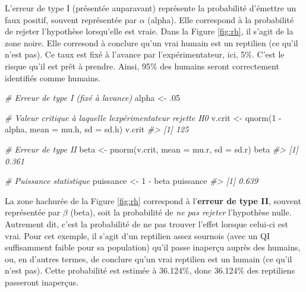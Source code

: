\documentclass[
]{book}
\newenvironment{Shaded}{}{}
\newcommand{\AttributeTok}[1]{#1}
\newcommand{\CommentTok}[1]{\textit{#1}}
\newcommand{\DecValTok}[1]{#1}
\newcommand{\FunctionTok}[1]{#1}
\newcommand{\NormalTok}[1]{#1}
\newcommand{\OtherTok}[1]{#1}
\newcommand{\SpecialCharTok}[1]{#1}
\begin{document}
L'erreur de type I (présentée auparavant) représente la probabilité d'émettre un faux positif, souvent représentée par \(\alpha\) (alpha). Elle correspond à la probabilité de rejeter l'hypothèse lorsqu'elle est vraie. Dans la Figure \ref{fig:rh}, il s'agit de la zone noire. Elle corresond à conclure qu'un vrai humain est un reptilien (ce qu'il n'est pas). Ce taux est fixé à l'avance par l'expérimentateur, ici, 5\%. C'est le risque qu'il est prêt à prendre. Ainsi, 95\% des humains seront correctement identifiés comme humains.

\begin{Shaded}
\begin{Highlighting}[]
\CommentTok{\# Erreur de type I (fixé à l\textquotesingle{}avance)}
\NormalTok{alpha }\OtherTok{\textless{}{-}}\NormalTok{ .}\DecValTok{05} 

\CommentTok{\# Valeur critique à laquelle l\textquotesingle{}expérimentateur rejette H0}
\NormalTok{v.crit }\OtherTok{\textless{}{-}} \FunctionTok{qnorm}\NormalTok{(}\DecValTok{1} \SpecialCharTok{{-}}\NormalTok{ alpha, }\AttributeTok{mean =}\NormalTok{ mu.h, }\AttributeTok{sd =}\NormalTok{ sd.h)}
\NormalTok{v.crit}
\CommentTok{\#\textgreater{} [1] 125}

\CommentTok{\# Erreur de type II}
\NormalTok{beta }\OtherTok{\textless{}{-}} \FunctionTok{pnorm}\NormalTok{(v.crit, }\AttributeTok{mean =}\NormalTok{ mu.r, }\AttributeTok{sd =}\NormalTok{ sd.r)}
\NormalTok{beta}
\CommentTok{\#\textgreater{} [1] 0.361}

\CommentTok{\# Puissance statistique}
\NormalTok{puissance }\OtherTok{\textless{}{-}} \DecValTok{1} \SpecialCharTok{{-}}\NormalTok{ beta}
\NormalTok{puissance }
\CommentTok{\#\textgreater{} [1] 0.639}
\end{Highlighting}
\end{Shaded}

La zone hachurée de la Figure \ref{fig:rh} correspond à l'\textbf{erreur de type II}, souvent représentée par \(\beta\) (beta), soit la probabilité de \emph{ne pas rejeter} l'hypothèse nulle. Autrement dit, c'est la probabilité de ne pas trouver l'effet lorsque celui-ci est vrai. Pour cet exemple, il s'agit d'un reptilien assez sournois (avec un QI suffisamment faible pour sa population) qu'il passe inaperçu auprès des humains, ou, en d'autres termes, de conclure qu'un vrai reptilien est un humain (ce qu'il n'est pas). Cette probabilité est estimée à 36.124\%, donc 36.124\% des reptiliens passeront inaperçus.
\end{document}
